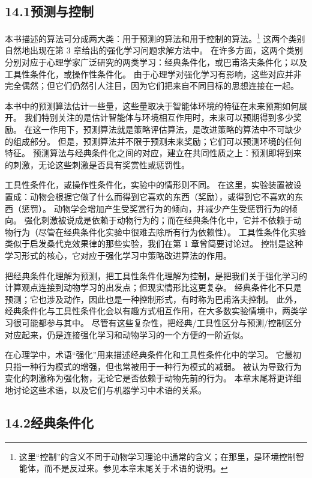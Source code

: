 \documentclass[UTF8,12pt,a4paper,fontset=fandol]{ctexart}
\begin{document}
\subsection*{14.1\quad 预测与控制}

本书描述的算法可分成两大类：用于预测的算法和用于控制的算法。\footnote{这里“控制”的含义不同于动物学习理论中通常的含义；在那里，是环境控制智能体，而不是反过来。参见本章末尾关于术语的说明。}
这两个类别自然地出现在第 3 章给出的强化学习问题求解方法中。
在许多方面，这两个类别分别对应于心理学家广泛研究的两类学习：经典条件化，或巴甫洛夫条件化；以及工具性条件化，或操作性条件化。
由于心理学对强化学习有影响，这些对应并非完全偶然；但它们仍然引人注目，因为它们把来自不同目标的思想连接在一起。

本书中的预测算法估计一些量，这些量取决于智能体环境的特征在未来预期如何展开。
我们特别关注的是估计智能体与环境相互作用时，未来可以预期得到多少奖励。
在这一作用下，预测算法就是策略评估算法，是改进策略的算法中不可缺少的组成部分。
但是，预测算法并不限于预测未来奖励；它们可以预测环境的任何特征。
预测算法与经典条件化之间的对应，建立在共同性质之上：预测即将到来的刺激，无论这些刺激是否具有奖赏性或惩罚性。

工具性条件化，或操作性条件化，实验中的情形则不同。
在这里，实验装置被设置成：动物会根据它做了什么而得到它喜欢的东西（奖励），或得到它不喜欢的东西（惩罚）。
动物学会增加产生受奖赏行为的倾向，并减少产生受惩罚行为的倾向。
强化刺激被说成是依赖于动物行为的；而在经典条件化中，它并不依赖于动物行为（尽管在经典条件化实验中很难去除所有行为依赖性）。
工具性条件化实验类似于启发桑代克效果律的那些实验，我们在第 1 章曾简要讨论过。
控制是这种学习形式的核心，它对应于强化学习中策略改进算法的作用。

把经典条件化理解为预测，把工具性条件化理解为控制，是把我们关于强化学习的计算观点连接到动物学习的出发点；但现实情形比这更复杂。
经典条件化不只是预测；它也涉及动作，因此也是一种控制形式，有时称为巴甫洛夫控制。
此外，经典条件化与工具性条件化会以有趣方式相互作用，在大多数实验情境中，两类学习很可能都参与其中。
尽管有这些复杂性，把经典/工具性区分与预测/控制区分对应起来，仍是连接强化学习和动物学习的一个方便的一阶近似。

在心理学中，术语“强化”用来描述经典条件化和工具性条件化中的学习。
它最初只指一种行为模式的增强，但也常被用于一种行为模式的减弱。
被认为导致行为变化的刺激称为强化物，无论它是否依赖于动物先前的行为。
本章末尾将更详细地讨论这些术语，以及它们与机器学习中术语的关系。

\subsection*{14.2\quad 经典条件化}
\end{document}
